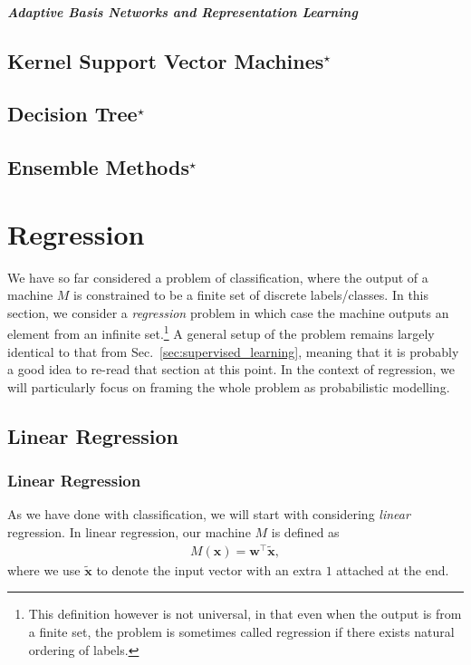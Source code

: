 \documentclass{report}
\newcommand{\vect}[1]{\mathbf{#1}}
\newcommand{\vx}[0]{\vect{x}}
\newcommand{\vw}[0]{\vect{w}}
\newcommand{\todo}[1]{{\Large\textcolor{red}{#1}}}
\begin{document}
\paragraph{Adaptive Basis Networks and Representation Learning}

\todo{}


\section{Kernel Support Vector Machines$^\star$}

\section{Decision Tree$^\star$}

\section{Ensemble Methods$^\star$}


\chapter{Regression}
\label{sec:regression}

We have so far considered a problem of classification, where the output of a
machine $M$ is constrained to be a finite set of discrete labels/classes. In
this section, we consider a {\it regression} problem in which case the machine
outputs an element from an infinite set.\footnote{
    This definition however is not universal, in that even when the output is
    from a finite set, the problem is sometimes called regression if there
    exists natural ordering of labels.
} A general setup of the problem remains largely identical to that from
Sec.~\ref{sec:supervised_learning}, meaning that it is probably a good idea to
re-read that section at this point.  In the context of regression, we will
particularly focus on framing the whole problem as probabilistic modelling. 

\section{Linear Regression}

\subsection{Linear Regression}

As we have done with classification, we will start with considering {\it linear}
regression. In linear regression, our machine $M$ is defined as 
\begin{align*}
    M(\vx) = \vw^\top \tilde{\vx},
\end{align*}
where we use $\tilde{\vx}$ to denote the input vector with an extra $1$ attached
at the end. 
\end{document}
